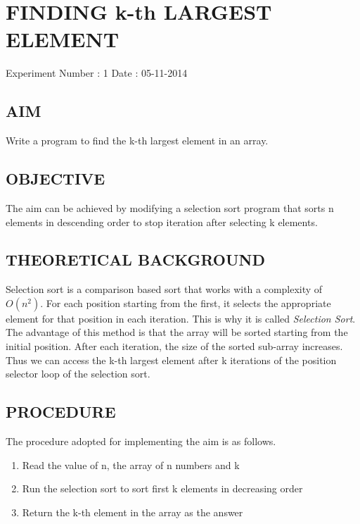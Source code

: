 \section{FINDING k-th LARGEST ELEMENT}
    Experiment Number : 1 \hfill Date : 05-11-2014
	
    \subsection{AIM}
		\par Write a program to find the k-th largest element in an array.
		
	\subsection{OBJECTIVE}
		\par The aim can be achieved by modifying a selection sort program that sorts n elements in descending order to stop iteration after selecting k elements.
		
    \subsection{THEORETICAL BACKGROUND}
		\par Selection sort is a comparison based sort that works with a complexity of $O(n^2)$. For each position starting from the first, it selects the appropriate element for that position in each iteration. This is why it is called \emph{Selection Sort}. The advantage of this method is that the array will be sorted starting from the initial position. After each iteration, the size of the sorted sub-array increases. Thus we can access the k-th largest element after k iterations of the position selector loop of the selection sort.
		
	\subsection{PROCEDURE}
		\par The procedure adopted for implementing the aim is as follows.
		\begin{enumerate}
			\item Read the value of n, the array of n numbers and k
			\item Run the selection sort to sort first k elements in decreasing order
			\item Return the k-th element in the array as the answer
		\end{enumerate}
	\newpage %
	

